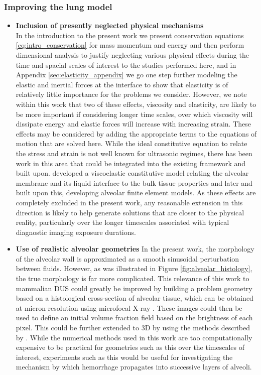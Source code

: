 \subsubsection{Improving the lung model}
\begin{itemize}
\item \textbf{Inclusion of presently neglected physical mechanisms}\\
  In the introduction to the present work we present conservation
  equations \ref{eq:intro_conservation} for mass momentum and energy
  and then perform dimensional analysis to justify neglecting various
  physical effects during the time and spacial scales of interest to
  the studies performed here, and in Appendix
  \ref{sec:elasticity_appendix} we go one step further modeling the
  elastic and inertial forces at the interface to show that elasticity
  is of relatively little importance for the problems we
  consider. However, we note within this work that two of these
  effects, viscosity and elasticity, are likely to be more important
  if considering longer time scales, over which viscosity will
  dissipate energy and elastic forces will increase with increasing
  strain. These effects may be considered by adding the appropriate
  terms to the equations of motion that are solved here. While the
  ideal constitutive equation to relate the stress and strain is not
  well known for ultrasonic regimes, there has been work in this area
  that could be integrated into the existing framework and built
  upon. \cite{Lanir1983} developed a viscoelastic constitutive model
  relating the alveolar membrane and its liquid interface to the bulk
  tissue properties and later \cite{Kowe1986} and \cite{Denny2000}
  built upon this, developing alveolar finite element models. As these
  effects are completely excluded in the present work, any reasonable
  extension in this direction is likely to help generate solutions
  that are closer to the physical reality, particularly over the
  longer timescales associated with typical diagnostic imaging
  exposure durations.
\item \textbf{Use of realistic alveolar geometries} In the present
  work, the morphology of the alveolar wall is approximated as a
  smooth sinusoidal perturbation between fluids. However, as was
  illustrated in Figure \ref{fig:alveolar_histology}, the true
  morphology is far more complicated. This relevance of this work to
  mammalian \ac{DUS} could greatly be improved by building a problem
  geometry based on a histological cross-section of alveolar tissue,
  which can be obtained at micron-resolution using microfocal X-ray
  \cite[]{Litzlbauer2006}. These images could then be used to define
  an initial volume fraction field based on the brightness of each
  pixel. This could be further extended to 3D by using the methods
  described by \cite{Parameswaran2009}. While the numerical methods
  used in this work are too computationally expensive to be practical
  for geometries such as this over the timescales of interest,
  experiments such as this would be useful for investigating the
  mechanism by which hemorrhage propagates into successive layers of
  alveoli.
\end{itemize}


